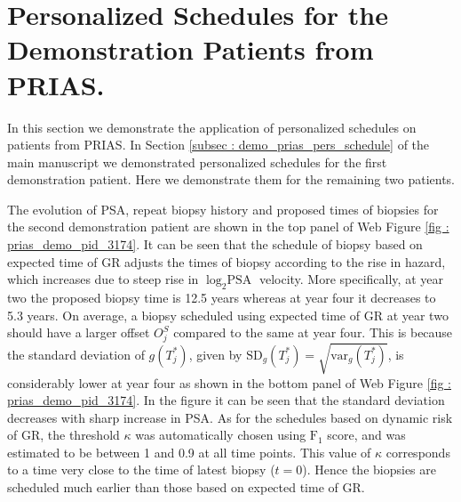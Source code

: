 
\section{Personalized Schedules for the Demonstration Patients from PRIAS.}
\label{sec : demo_3174_2340}

In this section we demonstrate the application of personalized schedules on patients from PRIAS. In Section \ref{subsec : demo_prias_pers_schedule} of the main manuscript we demonstrated personalized schedules for the first demonstration patient. Here we demonstrate them for the remaining two patients.

The evolution of PSA, repeat biopsy history and proposed times of biopsies for the second demonstration patient are shown in the top panel of Web Figure \ref{fig : prias_demo_pid_3174}. It can be seen that the schedule of biopsy based on expected time of GR adjusts the times of biopsy according to the rise in hazard, which increases due to steep rise in $\log_2 \mbox{PSA}$ velocity. More specifically, at year two the proposed biopsy time is 12.5 years whereas at year four it decreases to 5.3 years. On average, a biopsy scheduled using expected time of GR at year two should have a larger offset $O^S_j$ compared to the same at year four. This is because the standard deviation of $g(T^*_j)$, given by $\mbox{SD}_g(T^*_j) = \sqrt{\mbox{var}_g(T^*_j)}$, is considerably lower at year four as shown in the bottom panel of Web Figure \ref{fig : prias_demo_pid_3174}. In the figure it can be seen that the standard deviation decreases with sharp increase in PSA. As for the schedules based on dynamic risk of GR, the threshold $\kappa$ was automatically chosen using $\mbox{F}_1$ score, and was estimated to be between 1 and 0.9 at all time points. This value of $\kappa$ corresponds to a time very close to the time of latest biopsy ($t=0$). Hence the biopsies are scheduled much earlier than those based on expected time of GR.

